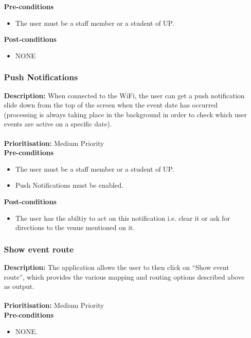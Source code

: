 \documentclass[runningheads,a4paper]{article}
\begin{document}
  
\textbf{Pre-conditions}
\begin{itemize}
	\item The user must be a staff member or a student of UP.
\end{itemize}
  
\textbf{Post-conditions}
\begin{itemize}
  	\item NONE
\end{itemize}

\subsubsection{Push Notifications}

\textbf{Description:} When connected to the WiFi, the user can get a push notification slide down from the top of the screen when the event date has occurred (processing is always taking place in the background in order to check which user events are active on a specific date).\\\\
\noindent
\textbf{Prioritisation:} Medium Priority\\
  
  
\textbf{Pre-conditions}
\begin{itemize}
	\item The user must be a staff member or a student of UP.
	\item Push Notifications must be enabled.
\end{itemize}
  
\textbf{Post-conditions}
\begin{itemize}
  	\item The user has the abiltiy to act on this notification i.e. clear it or ask for directions to the venue mentioned on it.
\end{itemize}

\subsubsection{Show event route}

\textbf{Description:} The application allows the user to then click on “Show event route”, which provides the various mapping and routing options described above as output.\\\\
\noindent
\textbf{Prioritisation:} Medium Priority\\
  
  
\textbf{Pre-conditions}
\begin{itemize}
	\item NONE.
\end{itemize}
  
\end{document}
